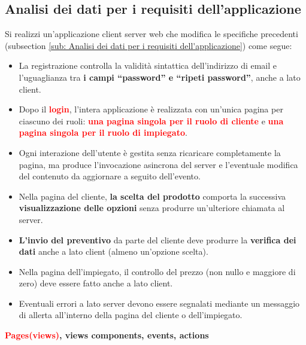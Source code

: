 \documentclass[a4paper, 12pt]{article}
\begin{document}
\subsection{Analisi dei dati per i requisiti dell'applicazione}
Si realizzi un’applicazione client server web che modifica le specifiche precedenti (subsection \ref{sub: Analisi dei dati per i requisiti dell'applicazione}) come segue:
\begin{itemize}
\item La registrazione controlla la validità sintattica dell’indirizzo di email e l’uguaglianza tra \textbf{\textcolor{myGreen}{i campi “password” e “ripeti password”}}, anche a lato client.
\item Dopo il \textbf{\textcolor{red}{login}}, l’intera applicazione è realizzata con un’unica pagina per ciascuno dei ruoli: \textbf{\textcolor{red}{una pagina singola per il ruolo di cliente}} e \textbf{\textcolor{red}{una pagina singola per il ruolo di impiegato}}.
\item Ogni interazione dell’utente è gestita senza ricaricare completamente la pagina, ma produce l’invocazione asincrona del server e l’eventuale modifica del contenuto da aggiornare a seguito dell’evento.
\item Nella pagina del cliente, \textbf{\textcolor{myBlue}{la scelta del prodotto}} comporta la successiva \textbf{\textcolor{myBrown}{visualizzazione delle opzioni}} senza produrre un’ulteriore chiamata al server.
\item \textbf{\textcolor{myBlue}{L’invio del preventivo}} da parte del cliente deve produrre la \textbf{\textcolor{myBrown}{verifica dei dati}} anche a lato client (almeno un’opzione scelta).
\item Nella pagina dell’impiegato, il controllo del prezzo (non nullo e maggiore di zero) deve essere fatto anche a lato client.
\item Eventuali errori a lato server devono essere segnalati mediante un messaggio di allerta all’interno della pagina del cliente o dell’impiegato.\\
\end{itemize}
\noindent \textbf{\textcolor{red}{Pages(views)}, \textcolor{myGreen}{views components}, \textcolor{myBlue}{events}, \textcolor{myBrown}{actions}}
\end{document}
